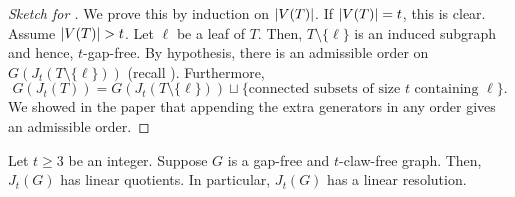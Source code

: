 \documentclass[12pt]{article}
\begin{document}
\begin{proof}[Sketch for ]
	We prove this by induction on ${\left\lvert V(T) \right\lvert}$. If ${\left\lvert V(T) \right\lvert} = t$, this is clear. Assume ${\left\lvert V(T) \right\lvert} > t$. \newline
	Let $\ell$ be a leaf of $T$. Then, $T \setminus \{\ell\}$ is an induced subgraph and hence, $t$-gap-free. By hypothesis, there is an admissible order on $G(J_{t}(T \setminus \{\ell\}))$ (recall ). Furthermore,
	\begin{equation*} 
		G(J_{t}(T)) = G(J_{t}(T \setminus \{\ell\})) \sqcup \{\text{connected subsets of size $t$ containing $\ell$}\}.
	\end{equation*}
	We showed in the paper that appending the extra generators in any order gives an admissible order.
\end{proof}

\begin{thm}
	Let $t \ge 3$ be an integer. Suppose $G$ is a gap-free and $t$-claw-free graph. Then, $J_{t}(G)$ has linear quotients. In particular, $J_{t}(G)$ has a linear resolution.
\end{thm}

\printbibliography
\end{document}

